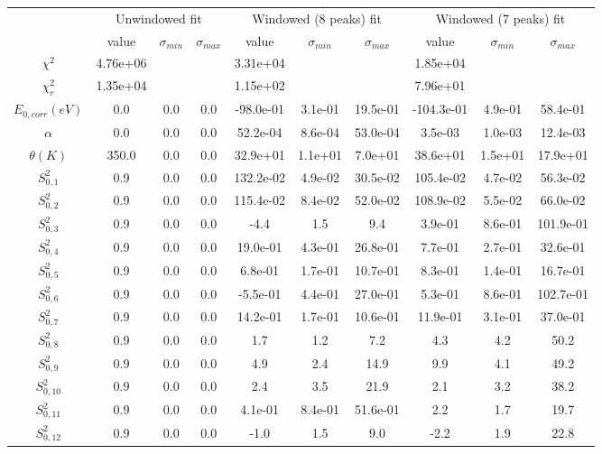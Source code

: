 \documentclass{article}
\begin{document}
\begin{landscape}
\begin{table}[ht]
\centering
\begin{tabular}{c|c|c|c|c|c|c|c|c|c}
\hline
&\multicolumn{3}{|c}{Unwindowed fit}&\multicolumn{3}{|c}{Windowed (8 peaks) fit}&\multicolumn{3}{|c}{Windowed (7 peaks) fit}\\
& value & $\sigma_{min}$ & $\sigma_{max}$& value & $\sigma_{min}$ & $\sigma_{max}$& value & $\sigma_{min}$ & $\sigma_{max}$\\
\hline
$\chi^2$   & 4.76e+06 & & & 3.31e+04 & & & 1.85e+04 & & \\
$\chi^2_r$ & 1.35e+04 & & & 1.15e+02 & & & 7.96e+01 & & \\
\hline
$E_{0,corr} (eV)$& 0.0 & 0.0 & 0.0 & -98.0e-01 & 3.1e-01 & 19.5e-01 & -104.3e-01 & 4.9e-01 & 58.4e-01 \\
$\alpha $       & 0.0 & 0.0 & 0.0 & 52.2e-04 & 8.6e-04 & 53.0e-04 & 3.5e-03 & 1.0e-03 & 12.4e-03 \\
$\theta (K) $   & 350.0 & 0.0 & 0.0 & 32.9e+01 & 1.1e+01 & 7.0e+01 & 38.6e+01 & 1.5e+01 & 17.9e+01 \\
$S^2_{0,1}$& 0.9 & 0.0 & 0.0 & 132.2e-02 & 4.9e-02 & 30.5e-02 & 105.4e-02 & 4.7e-02 & 56.3e-02 \\
$S^2_{0,2}$& 0.9 & 0.0 & 0.0 & 115.4e-02 & 8.4e-02 & 52.0e-02 & 108.9e-02 & 5.5e-02 & 66.0e-02 \\
$S^2_{0,3}$& 0.9 & 0.0 & 0.0 & -4.4 & 1.5 & 9.4 & 3.9e-01 & 8.6e-01 & 101.9e-01 \\
$S^2_{0,4}$& 0.9 & 0.0 & 0.0 & 19.0e-01 & 4.3e-01 & 26.8e-01 & 7.7e-01 & 2.7e-01 & 32.6e-01 \\
$S^2_{0,5}$& 0.9 & 0.0 & 0.0 & 6.8e-01 & 1.7e-01 & 10.7e-01 & 8.3e-01 & 1.4e-01 & 16.7e-01 \\
$S^2_{0,6}$& 0.9 & 0.0 & 0.0 & -5.5e-01 & 4.4e-01 & 27.0e-01 & 5.3e-01 & 8.6e-01 & 102.7e-01 \\
$S^2_{0,7}$& 0.9 & 0.0 & 0.0 & 14.2e-01 & 1.7e-01 & 10.6e-01 & 11.9e-01 & 3.1e-01 & 37.0e-01 \\
$S^2_{0,8}$& 0.9 & 0.0 & 0.0 & 1.7 & 1.2 & 7.2 & 4.3 & 4.2 & 50.2 \\
$S^2_{0,9}$& 0.9 & 0.0 & 0.0 & 4.9 & 2.4 & 14.9 & 9.9 & 4.1 & 49.2 \\
$S^2_{0,10}$& 0.9 & 0.0 & 0.0 & 2.4 & 3.5 & 21.9 & 2.1 & 3.2 & 38.2 \\
$S^2_{0,11}$& 0.9 & 0.0 & 0.0 & 4.1e-01 & 8.4e-01 & 51.6e-01 & 2.2 & 1.7 & 19.7 \\
$S^2_{0,12}$& 0.9 & 0.0 & 0.0 & -1.0 & 1.5 & 9.0 & -2.2 & 1.9 & 22.8 \\

\end{tabular}
\end{table}
\end{landscape}
\end{document}
